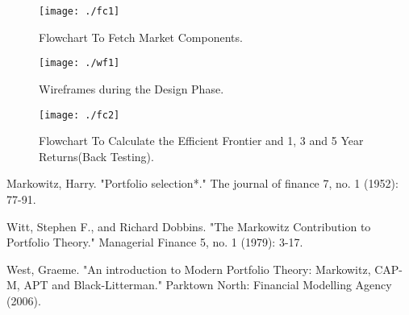\begin{figure}[!htb]
\centering
\vspace{-3cm}
\texttt{[image: ./fc1]}
\caption{Flowchart To Fetch Market Components.}
\label{fig:fc1}
\end{figure}



\begin{figure}[!h]
\centering
\vspace{-3cm}
\texttt{[image: ./wf1]}
\caption{Wireframes during the Design Phase.}
\label{fig:wireframe}
\end{figure}


\begin{figure}
\centering
\vspace{-3cm}
\texttt{[image: ./fc2]}
\caption{Flowchart To Calculate the Efficient Frontier and 1, 3 and 5 Year Returns(Back Testing).}
\label{fig:fc2}
\end{figure}


\clearpage
\begin{thebibliography}{1}
Markowitz, Harry. "Portfolio selection*." The journal of finance 7, no. 1 (1952): 77-91.

Witt, Stephen F., and Richard Dobbins. "The Markowitz Contribution to Portfolio Theory." Managerial Finance 5, no. 1 (1979): 3-17.


West, Graeme. "An introduction to Modern Portfolio Theory: Markowitz, CAP-M, APT and Black-Litterman." Parktown North: Financial Modelling Agency (2006).
\end{thebibliography}

